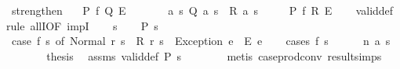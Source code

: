 \begin{isabellebody}
\endisatagproof
{\isafoldproof}%
%
\isadelimproof
\isanewline
%
\endisadelimproof
\isanewline
{}\isamarkupfalse%
\ strengthen{\isacharcolon}{\kern0pt}\isanewline
\ \ \ {\isachardoublequoteopen}{\isasymlbrace}P{\isasymrbrace}\ f\ {\isasymlbrace}Q{\isasymrbrace}{\isacharcomma}{\kern0pt}\ {\isasymlbrace}E{\isasymrbrace}{\isachardoublequoteclose}\isanewline
\ \ \ \ \ \ \ {\isachardoublequoteopen}{\isasymforall}a\ s{\isachardot}{\kern0pt}\ Q\ a\ s\ {\isasymlongrightarrow}\ R\ a\ s{\isachardoublequoteclose}\isanewline
\ \ \ \ \ {\isachardoublequoteopen}{\isasymlbrace}P{\isasymrbrace}\ f\ {\isasymlbrace}R{\isasymrbrace}{\isacharcomma}{\kern0pt}\ {\isasymlbrace}E{\isasymrbrace}{\isachardoublequoteclose}\isanewline
%
\isadelimproof
\ \ %
\endisadelimproof
%
\isatagproof
{}\isamarkupfalse%
\ valid{\isacharunderscore}{\kern0pt}def\isanewline
{}\isamarkupfalse%
{\isacharparenleft}{\kern0pt}rule\ allI{\isacharbrackleft}{\kern0pt}OF\ impI{\isacharbrackright}{\kern0pt}{\isacharparenright}{\kern0pt}\isanewline
\ \ \isamarkupfalse%
\ s\isanewline
\ \ \isamarkupfalse%
\ {\isachardoublequoteopen}P\ s{\isachardoublequoteclose}\isanewline
\ \ \isamarkupfalse%
\ {\isachardoublequoteopen}case\ f\ s\ of\ Normal\ {\isacharparenleft}{\kern0pt}r{\isacharcomma}{\kern0pt}\ s{\isacharprime}{\kern0pt}{\isacharparenright}{\kern0pt}\ {\isasymRightarrow}\ R\ r\ s{\isacharprime}{\kern0pt}\ {\isacharbar}{\kern0pt}\ Exception\ e\ {\isasymRightarrow}\ E\ e{\isachardoublequoteclose}\isanewline
\ \ \isamarkupfalse%
\ {\isacharparenleft}{\kern0pt}cases\ {\isachardoublequoteopen}f\ s{\isachardoublequoteclose}{\isacharparenright}{\kern0pt}\isanewline
\ \ \ \ \isamarkupfalse%
\ {\isacharparenleft}{\kern0pt}n\ a\ s{\isacharprime}{\kern0pt}{\isacharparenright}{\kern0pt}\isanewline
\ \ \ \ \isamarkupfalse%
\ \isamarkupfalse%
\ {\isacharquery}{\kern0pt}thesis\ \isamarkupfalse%
\ assms\ valid{\isacharunderscore}{\kern0pt}def\ {\isacartoucheopen}P\ s{\isacartoucheclose}\isanewline
\ \ \ \ \ \ \isamarkupfalse%
\ {\isacharparenleft}{\kern0pt}metis\ case{\isacharunderscore}{\kern0pt}prod{\isacharunderscore}{\kern0pt}conv\ result{\isachardot}{\kern0pt}simps{\isacharparenleft}{\kern0pt}{}{\isacharparenright}{\kern0pt}{\isacharparenright}{\kern0pt}\isanewline
\ \ \isamarkupfalse%
\isanewline
\ \ \ \ \isamarkupfalse%

\end{isabellebody}
